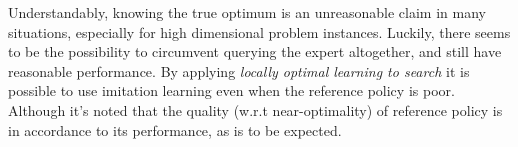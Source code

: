 Understandably, knowing the true optimum is an unreasonable claim in many 
situations, especially for high dimensional problem instances. 
Luckily, there seems to be the possibility to circumvent querying the expert 
altogether, and still have reasonable performance. 
By applying \emph{locally optimal learning to search} \citep{ChangKADL15} it is 
possible to use imitation learning even when the reference policy is poor. 
Although it's noted that the quality (w.r.t near-optimality) of reference 
policy is in accordance to its performance, as is to be expected. 

